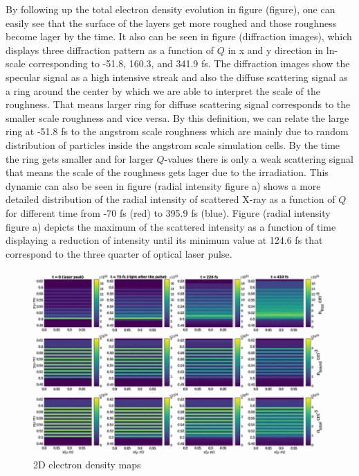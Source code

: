 \documentclass[preprint, 12pt]{elsarticle}
\begin{document}
By following up the total electron density evolution in figure (figure), one can easily see that the surface of the layers get more roughed and those roughness become lager by the time. It also can be seen in figure (diffraction images), which displays three diffraction pattern as a function of $Q$ in x and y direction in ln-scale corresponding to -51.8, 160.3, and 341.9 fs. The diffraction images show the specular signal as a high intensive streak and also the diffuse scattering signal as a ring around the center by which we are able to interpret the scale of the roughness. That means larger ring for diffuse scattering signal corresponds to the smaller scale roughness and vice versa. By this definition, we can relate the large ring at -51.8 fs to the angstrom scale roughness which are mainly due to random distribution of particles inside the angstrom scale simulation cells. By the time the ring gets smaller and for larger $Q$-values there is only a weak scattering signal that means the scale of the roughness gets lager due to the irradiation. This dynamic can also be seen in figure (radial intensity figure a) shows a more detailed distribution of the radial intensity of scattered X-ray as a function of $Q$ for different time from -70 fs (red) to 395.9 fs (blue). Figure (radial intensity figure a) depicts the maximum of the scattered intensity as a function of time displaying a reduction of intensity until its minimum value at 124.6 fs that correspond to the three quarter of optical laser pulse.

\begin{figure}[h]
\centering\includegraphics[width=1.0\linewidth]{paper_plot.png}
\caption{2D electron density maps}
\end{figure}
\end{document}
